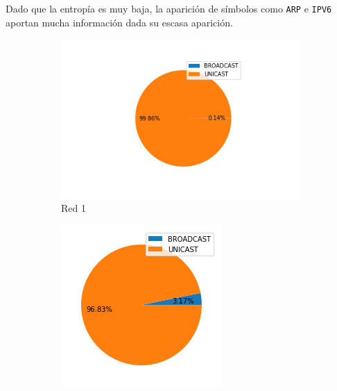 Dado que la entropía es muy baja, la aparición de símbolos como \texttt{ARP} e \texttt{IPV6} aportan mucha información dada su escasa aparición.
\begin{figure}[H]
    \centering
    \begin{subfigure}[b]{0.3\textwidth}
        \centering
        \includegraphics[width=\textwidth]{images/resultados_diego/red_1_broadcast_unicast.png}
        \caption{Red 1}
        \label{fig: b/u red 1}
    \end{subfigure}
    \begin{subfigure}[b]{0.3\textwidth} 
        \centering
        \includegraphics[scale=0.7, width=\textwidth]{images/resultados_agus/red_2_broadcast_unicast.png}

\end{subfigure}
\end{figure}
